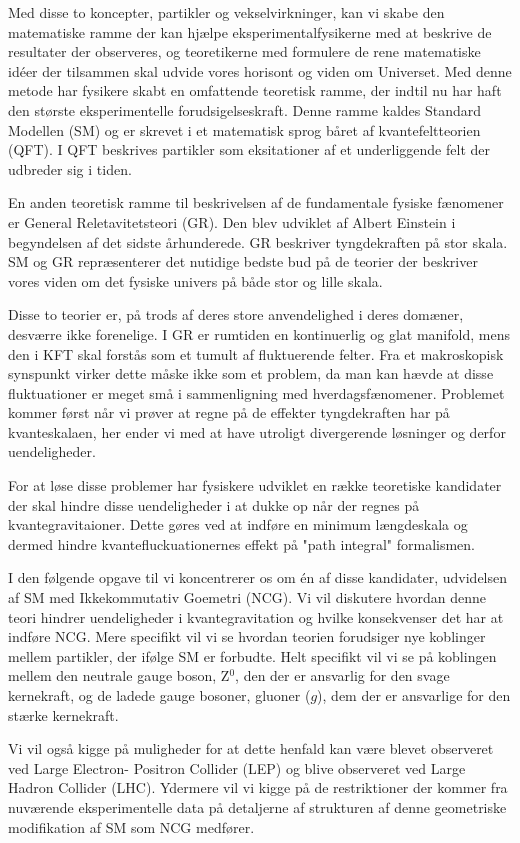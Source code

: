Med disse to koncepter, partikler og vekselvirkninger, kan vi skabe den matematiske ramme der kan hjælpe eksperimentalfysikerne med at beskrive de resultater der observeres, og teoretikerne med formulere de rene matematiske idéer der tilsammen skal udvide vores horisont og viden om Universet. Med denne metode har fysikere skabt en omfattende teoretisk ramme, der indtil nu har haft den største eksperimentelle forudsigelseskraft. Denne ramme kaldes Standard Modellen (SM) og er skrevet i et matematisk sprog båret af kvantefeltteorien (QFT). I QFT beskrives partikler som eksitationer af et underliggende felt der udbreder sig i tiden.

En anden teoretisk ramme til beskrivelsen af de fundamentale fysiske fænomener er General Reletavitetsteori (GR). Den blev udviklet af Albert Einstein i begyndelsen af det sidste århunderede. GR beskriver tyngdekraften på stor skala. SM og GR repræsenterer det nutidige bedste bud på de teorier der beskriver vores viden om det fysiske univers på både stor og lille skala.

Disse to teorier er, på trods af deres store anvendelighed i deres domæner, desværre ikke forenelige. I GR er rumtiden en kontinuerlig og glat manifold, mens den i KFT skal forstås som et tumult af fluktuerende felter. Fra et makroskopisk synspunkt virker dette måske ikke som et problem, da man kan hævde at disse fluktuationer er meget små i sammenligning med hverdagsfænomener. Problemet kommer først når vi prøver at regne på de effekter tyngdekraften har på kvanteskalaen, her ender vi med at have utroligt divergerende løsninger og derfor uendeligheder.

For at løse disse problemer har fysiskere udviklet en række teoretiske kandidater der skal hindre disse uendeligheder i at dukke op når der regnes på kvantegravitaioner. Dette gøres ved at indføre en minimum længdeskala og dermed hindre kvantefluckuationernes effekt på "path integral" formalismen.

I den følgende opgave til vi koncentrerer os om én af disse kandidater, udvidelsen af SM med Ikkekommutativ Goemetri (NCG). Vi vil diskutere hvordan denne teori hindrer uendeligheder i kvantegravitation og hvilke konsekvenser det har at indføre NCG. Mere specifikt vil vi se hvordan teorien forudsiger nye koblinger mellem partikler, der ifølge SM er forbudte. Helt specifikt vil vi se på koblingen mellem den neutrale gauge boson, Z$^{0}$, den der er ansvarlig for den svage kernekraft, og de ladede gauge bosoner, gluoner ($g$), dem der er ansvarlige for den stærke kernekraft.

Vi vil også kigge på muligheder for at dette henfald kan være blevet observeret ved Large Electron- Positron Collider (LEP) og blive observeret ved Large Hadron Collider (LHC). Ydermere vil vi kigge på de restriktioner der kommer fra nuværende eksperimentelle data på detaljerne af strukturen af denne geometriske modifikation af SM som NCG medfører.
